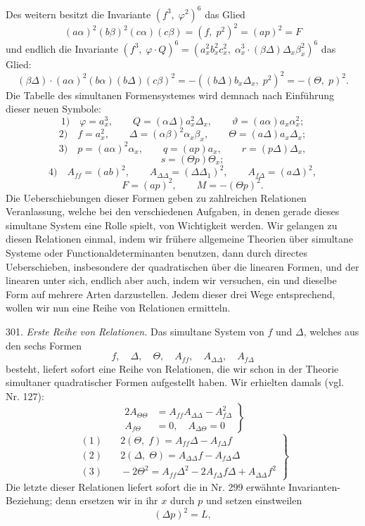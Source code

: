 \documentclass[11pt]{article}
\providecommand{\weberpage}[1]{}
\providecommand{\weq}[2]{\begin{equation}\tag{#1}#2\end{equation}}
\let\Delta\varDelta
\let\Theta\varTheta
\begin{document}
\weberpage{324}
Des weitern besitzt die Invariante $(f^3, \; \varphi^2)^6$ das Glied
\[
(a\alpha)^2(b\beta)^2(c\alpha)(c\beta) = (f, \; p^2)^2 = (ap)^2 = F
\]
und endlich die Invariante $(f^3, \; \varphi \cdot Q)^6 = (a_x^2 b_x^2 c_x^2, \; \alpha_x^3 \cdot (\beta\Delta)\Delta_x \beta_x^2)^6$ das Glied:
\[
(\beta\Delta) \cdot (a\alpha)^2(b\alpha)(b\Delta)(c\beta)^2 = -((b\Delta)b_x\Delta_x, \; p^2)^2 = -(\Theta, \; p)^2.
\]
Die Tabelle des simultanen Formensystemes wird demnach nach Einführung dieser neuen Symbole:
\[
1) \quad \varphi = a_x^3, \qquad Q = (\alpha\Delta)a_x^2\Delta_x, \qquad \vartheta = (a\alpha)a_x\alpha_x^2;
\]
\[
2) \quad f = a_x^2, \qquad \Delta = (\alpha\beta)^2\alpha_x\beta_x, \qquad \Theta = (a\Delta)a_x\Delta_x;
\]
\[
3) \quad p = (a\alpha)^2\alpha_x, \qquad q = (ap)a_x, \qquad r = (p\Delta)\Delta_x,
\]
\[
\qquad s = (\Theta p)\Theta_x;
\]
\[
4) \quad A_{ff} = (ab)^2, \qquad A_{\Delta\Delta} = (\Delta\Delta_1)^2, \qquad A_{f\Delta} = (a\Delta)^2,
\]
\[
\qquad F = (ap)^2, \qquad M = -(\Theta p)^2.
\]
Die Ueberschiebungen dieser Formen geben zu zahlreichen Relationen Veranlassung, welche bei den verschiedenen Aufgaben, in denen gerade dieses simultane System eine Rolle spielt, von Wichtigkeit werden. Wir gelangen zu diesen Relationen einmal, indem wir frühere allgemeine Theorien über simultane Systeme oder Functionaldeterminanten benutzen, dann durch directes Ueberschieben, insbesondere der quadratischen über die linearen Formen, und der linearen unter sich, endlich aber auch, indem wir versuchen, ein und dieselbe Form auf mehrere Arten darzustellen. Jedem dieser drei Wege entsprechend, wollen wir nun eine Reihe von Relationen ermitteln.

301. \textit{Erste Reihe von Relationen.} Das simultane System von $f$ und $\Delta$, welches aus den sechs Formen
\[
f, \quad \Delta, \quad \Theta, \quad A_{ff}, \quad A_{\Delta\Delta}, \quad A_{f\Delta}
\]
besteht, liefert sofort eine Reihe von Relationen, die wir schon in der Theorie simultaner quadratischer Formen aufgestellt haben. Wir erhielten damals (vgl. Nr. 127):
\weq{I}{\left.\begin{aligned} 2A_{\Theta\Theta} &= A_{ff}A_{\Delta\Delta} - A_{f\Delta}^2 \\ A_{f\Theta} &= 0, \quad A_{\Delta\Theta} = 0 \end{aligned}\right\}}
\weq{II}{\left.\begin{aligned} (1) &\quad 2(\Theta, \; f) = A_{ff}\Delta - A_{f\Delta}f \\ (2) &\quad 2(\Delta, \; \Theta) = A_{\Delta\Delta}f - A_{f\Delta}\Delta \\ (3) &\quad -2\Theta^2 = A_{ff}\Delta^2 - 2A_{f\Delta}f\Delta + A_{\Delta\Delta}f^2 \end{aligned}\right\}}
Die letzte dieser Relationen liefert sofort die in Nr. 299 erwähnte Invarianten-Beziehung; denn ersetzen wir in ihr $x$ durch $p$ und setzen einstweilen
\[
(\Delta p)^2 = L,
\]
\end{document}
